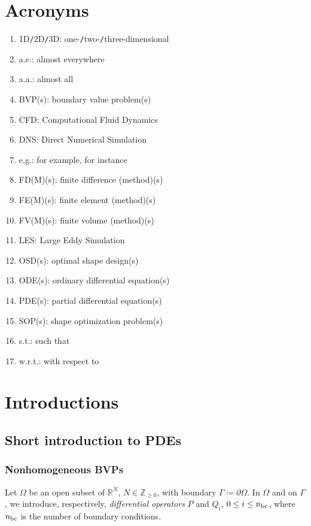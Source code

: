 \documentclass[oneside,11pt]{book}
\numberwithin{equation}{section}
\begin{document}
\chapter*{Acronyms}
\begin{multicols}{2}
    \begin{enumerate}
        \item 1D\texttt{/}2D\texttt{/}3D: one-\texttt{/}two-\texttt{/}three-dimensional
        \item a.e.: almost everywhere
        \item a.a.: almost all
        \item BVP(s): boundary value problem(s)
        \item CFD: Computational Fluid Dynamics
        \item DNS: Direct Numerical Simulation
        \item e.g.: for example, for instance
        \item FD(M)(s): finite difference (method)(s)
        \item FE(M)(s): finite element (method)(s)
        \item FV(M)(s): finite volume (method)(s)
        \item LES: Large Eddy Simulation
        \item OSD(s): optimal shape design(s)
        \item ODE(s): ordinary differential equation(s)
        \item PDE(s): partial differential equation(s)
        \item SOP(s): shape optimization problem(s)
        \item s.t.: such that
        \item w.r.t.: with respect to
    \end{enumerate}
\end{multicols}


\chapter{Introductions}

\section{Short introduction to PDEs}

\subsection{Nonhomogeneous BVPs}
Let $\Omega$ be an open subset of $\mathbb{R}^N$, $N\in\mathbb{Z}_{\ge 0}$, with boundary $\Gamma\coloneqq\partial\Omega$. In $\Omega$ and on $\Gamma$, we introduce, respectively, \textit{differential operators} $P$ and $Q_i$, $0\le i\le n_{\rm bc}$, where $n_{\rm bc}$ is the number of boundary conditions.
\end{document}
